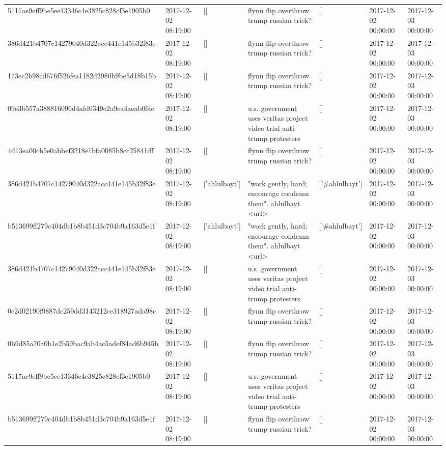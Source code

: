 \begin{tabular}{lllllll}
5117ae9eff9be5ee13346c4e3825c828cf3e1905b0 & 2017-12-02 08:19:00 & [] & flynn flip overthrow trump russian trick? & [] & 2017-12-02 00:00:00 & 2017-12-03 00:00:00 \\
386d421b4707c14279040d322acc441e145b32f83e & 2017-12-02 08:19:00 & [] & flynn flip overthrow trump russian trick? & [] & 2017-12-02 00:00:00 & 2017-12-03 00:00:00 \\
173ec2b98cd676f526fea1182d2980b9be5d18b15b & 2017-12-02 08:19:00 & [] & flynn flip overthrow trump russian trick? & [] & 2017-12-02 00:00:00 & 2017-12-03 00:00:00 \\
09e3b557a388816096d4afd0349c2a9ea4aeab06fc & 2017-12-02 08:19:00 & [] & u.s. government uses veritas project video trial anti-trump protesters & [] & 2017-12-02 00:00:00 & 2017-12-03 00:00:00 \\
4d13ea00cb5e0abbef3218e1bfa0085b8cc25841df & 2017-12-02 08:19:00 & [] & flynn flip overthrow trump russian trick? & [] & 2017-12-02 00:00:00 & 2017-12-03 00:00:00 \\
386d421b4707c14279040d322acc441e145b32f83e & 2017-12-02 08:19:00 & ['ahlulbayt'] & "work gently, hard; encourage condemn them". ahlulbayt <url> & ['#ahlulbayt'] & 2017-12-02 00:00:00 & 2017-12-03 00:00:00 \\
b513699ff279c404db1b8b451d3c704b9a163d5e1f & 2017-12-02 08:19:00 & ['ahlulbayt'] & "work gently, hard; encourage condemn them". ahlulbayt <url> & ['#ahlulbayt'] & 2017-12-02 00:00:00 & 2017-12-03 00:00:00 \\
386d421b4707c14279040d322acc441e145b32f83e & 2017-12-02 08:19:00 & [] & u.s. government uses veritas project video trial anti-trump protesters & [] & 2017-12-02 00:00:00 & 2017-12-03 00:00:00 \\
0e2d02190f9887dc259dd3143212ce318927ada98c & 2017-12-02 08:19:00 & [] & flynn flip overthrow trump russian trick? & [] & 2017-12-02 00:00:00 & 2017-12-03 00:00:00 \\
0b9d85a70a0b1e2b59bac9ab4ac5adef84ad6b945b & 2017-12-02 08:19:00 & [] & flynn flip overthrow trump russian trick? & [] & 2017-12-02 00:00:00 & 2017-12-03 00:00:00 \\
5117ae9eff9be5ee13346c4e3825c828cf3e1905b0 & 2017-12-02 08:19:00 & [] & u.s. government uses veritas project video trial anti-trump protesters & [] & 2017-12-02 00:00:00 & 2017-12-03 00:00:00 \\
b513699ff279c404db1b8b451d3c704b9a163d5e1f & 2017-12-02 08:19:00 & [] & flynn flip overthrow trump russian trick? & [] & 2017-12-02 00:00:00 & 2017-12-03 00:00:00 \\

\end{tabular}
